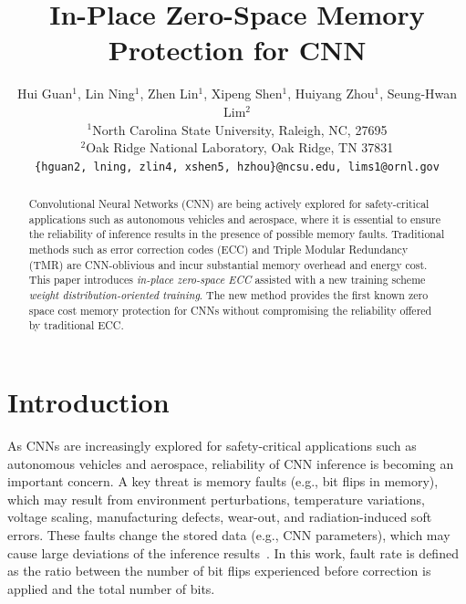 \documentclass{article}
\title{In-Place Zero-Space Memory Protection for CNN}
\author{%
  Hui Guan$^{1}$, Lin Ning$^{1}$, Zhen Lin$^1$, Xipeng Shen$^1$, Huiyang Zhou$^1$,  Seung-Hwan Lim$^2$  \\
  $^1$North Carolina State University, Raleigh, NC, 27695\\
  $^2$Oak Ridge National Laboratory, Oak Ridge, TN 37831 \\
  \texttt{\{hguan2, lning, zlin4, xshen5, hzhou\}@ncsu.edu, lims1@ornl.gov}\\
}
\begin{document}
\maketitle

\begin{abstract}
Convolutional Neural Networks (CNN) are being actively explored for safety-critical applications such as autonomous vehicles and aerospace, where it is essential to ensure the reliability of inference results in the presence of possible memory faults. Traditional methods such as error correction codes (ECC) and Triple Modular Redundancy (TMR) are CNN-oblivious and incur substantial memory overhead and energy cost. This paper introduces {\em in-place zero-space ECC} assisted with a new training scheme {\em weight distribution-oriented training}. The new method provides the first known zero space cost memory protection for CNNs without compromising the reliability offered by traditional ECC. 



\end{abstract}

\section{Introduction}

As CNNs are increasingly explored for safety-critical applications such as autonomous vehicles and aerospace, reliability of CNN inference is becoming an important concern. A key threat is memory faults (e.g., bit flips in memory), which may result from environment perturbations, temperature variations, voltage scaling, manufacturing defects, wear-out, and radiation-induced soft errors. These faults change the stored data (e.g., CNN parameters), which may cause large deviations of the inference results~\cite{li2017understanding, reagen2018ares, reagen2016minerva}. In this work, fault rate is defined as the ratio between the number of bit flips experienced before correction is applied and the total number of bits. 
\end{document}
